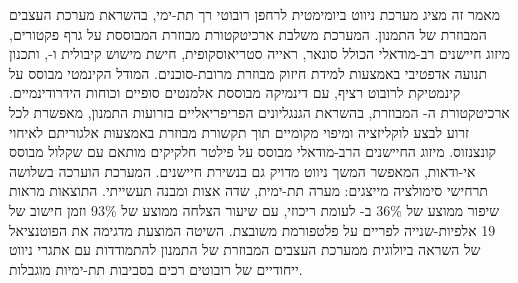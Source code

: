 


מאמר זה מציג מערכת ניווט ביומימטית לרחפן רובוטי רך תת-ימי, בהשראת מערכת העצבים המבוזרת של התמנון. המערכת משלבת ארכיטקטורת  מבוזרת המבוססת על גרף פקטורים, מיזוג חיישנים רב-מודאלי הכולל סונאר, ראייה סטריאוסקופית, חישת מישוש קיבולית ו-, ותכנון תנועה אדפטיבי באמצעות למידת חיזוק מבוזרת מרובת-סוכנים. המודל הקינמטי מבוסס על קינמטיקת  לרובוט רציף, עם דינמיקה מבוססת אלמנטים סופיים וכוחות הידרודינמיים. ארכיטקטורת ה- המבוזרת, בהשראת הגנגליונים הפריפריאליים בזרועות התמנון, מאפשרת לכל זרוע לבצע לוקליזציה ומיפוי מקומיים תוך תקשורת מבוזרת באמצעות אלגוריתם  לאיחוי קונצנזוס. מיזוג החיישנים הרב-מודאלי מבוסס על פילטר חלקיקים מותאם עם שקלול מבוסס אי-ודאות, המאפשר המשך ניווט מדויק גם בנשירת חיישנים. המערכת הוערכה בשלושה תרחישי סימולציה מייצגים: מערה תת-ימית, שדה אצות ומבנה תעשייתי. התוצאות מראות שיפור ממוצע של 36\% ב- לעומת  ריכוזי, עם שיעור הצלחה ממוצע של 93\% וזמן חישוב של 19 אלפיות-שנייה לפריים על פלטפורמת  משובצת. השיטה המוצעת מדגימה את הפוטנציאל של השראה ביולוגית ממערכת העצבים המבוזרת של התמנון להתמודדות עם אתגרי ניווט ייחודיים של רובוטים רכים בסביבות תת-ימיות מוגבלות.


